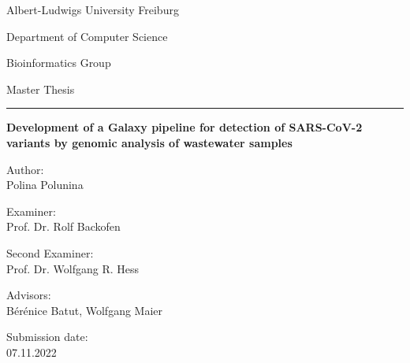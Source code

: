 %
\begin{titlepage}
 \centering
 Albert-Ludwigs University Freiburg
 
 Department of Computer Science
 
 Bioinformatics Group
 \vspace{4cm}
 
  Master Thesis
 \vspace{3mm} 
  
 \huge \hrule \vspace{5mm}
 \textbf{Development of a Galaxy pipeline for detection of SARS-CoV-2 variants by genomic analysis of wastewater samples}
 
 \hrulefill
 
 \vfill
 \raggedright
 \normalsize
  Author:\\
  Polina Polunina 
  
  Examiner:\\
  Prof. Dr. Rolf Backofen
  
  Second Examiner:\\
  Prof. Dr. Wolfgang R. Hess
  
  Advisors:\\
  Bérénice Batut, Wolfgang Maier
  
  Submission date:\\
  07.11.2022

\end{titlepage}
